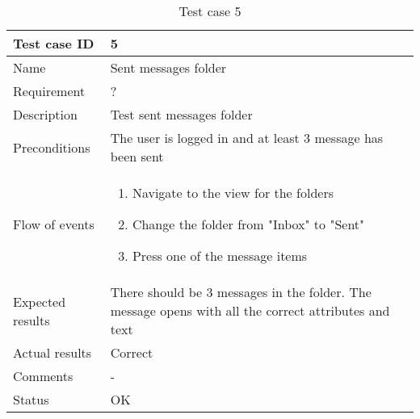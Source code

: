 		\begin{table}
			\begin{tabular}{l|p{10cm}}
				Test case ID & 5 \\ \hline
				Name & Sent messages folder\\ \hline
				Requirement & ?\\ \hline
				Description & Test sent messages folder\\ \hline
				Preconditions & The user is logged in and at least 3 message has been sent\\ \hline
				Flow of events & 
					\begin{enumerate}
						\item{}Navigate to the view for the folders
						\item{}Change the folder from "Inbox" to "Sent"
						\item{}Press one of the message items
					\end{enumerate} \\ \hline
				Expected results & There should be 3 messages in the folder. The message opens with all the correct 							attributes and text\\ \hline
				Actual results & Correct\\ \hline
				Comments &-\\ \hline
				Status &OK \\ \hline
			\end{tabular}
			\caption{Test case 5} \label{tab:case5}
		\end{table}

